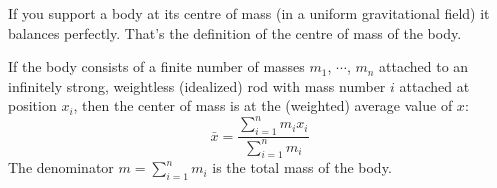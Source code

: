 \begin{frame}[t]
If you support a body at its centre of mass (in a uniform gravitational
field) it balances perfectly. That's the definition of the centre of mass
of the body.
\begin{center}\end{center}

If the body consists of a finite number of masses $m_1$, $\cdots$, $m_n$
attached to an infinitely strong, weightless (idealized) rod with mass
number $i$ attached at position $x_i$, then the center of mass is
at the (weighted) average value of $x$:
\[
\bar x =\frac{\sum_{i=1}^n m_ix_i}{\sum_{i=1}^n m_i}
\]
The denominator $m=\sum_{i=1}^n m_i$ is the total mass of the body.


\end{frame}
